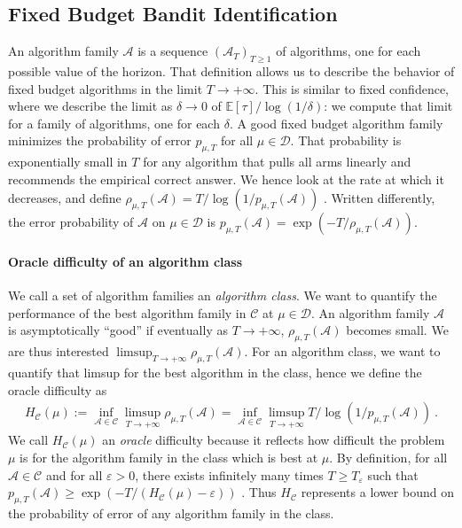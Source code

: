 \documentclass{article}
\begin{document}
\subsection{Fixed Budget Bandit Identification}
\label{sub:fixed_budget_bandit_identification}

An algorithm family $\mathcal A$ is a sequence $(\mathcal A_T)_{T \ge 1}$ of algorithms, one for each possible value of the horizon.
That definition allows us to describe the behavior of fixed budget algorithms in the limit $T \to +\infty$.
This is similar to fixed confidence, where we describe the limit as $\delta\to 0$ of $\mathbb{E}[\tau]/\log(1/\delta)$: we compute that limit for a family of algorithms, one for each $\delta$.
A good fixed budget algorithm family minimizes the probability of error $p_{\mu, T}$ for all $\mu \in \mathcal D$.
That probability is exponentially small in $T$ for any algorithm that pulls all arms linearly and recommends the empirical correct answer. We hence look at the rate at which it decreases, and define
$\rho_{\mu, T}(\mathcal A) = T / \log(1/p_{\mu, T}(\mathcal A))$ .
Written differently, the error probability of $\mathcal A$ on $\mu \in \mathcal D$ is $p_{\mu, T}(\mathcal A) = \exp(-T/\rho_{\mu, T}(\mathcal A))$.

\paragraph{Oracle difficulty of an algorithm class}
\label{par:oracle_difficulty_of_an_algorithm_class}

We call a set of algorithm families an \emph{algorithm class}.
We want to quantify the performance of the best algorithm family in $\mathcal C$ at $\mu \in \mathcal D$.
An algorithm family $\mathcal A$ is asymptotically ``good'' if eventually as $T \to + \infty$, $\rho_{\mu, T}(\mathcal A)$ becomes small.
We are thus interested $\limsup_{T \to +\infty} \rho_{\mu, T}(\mathcal A)$.
For an algorithm class, we want to quantify that limsup for the best algorithm in the class, hence we define the oracle difficulty as 
\begin{align*}
H_{\mathcal C}(\mu)
:= \inf_{\mathcal A \in \mathcal C} \limsup_{T \to +\infty} \rho_{\mu, T}(\mathcal A)
= \inf_{\mathcal A \in \mathcal C} \limsup_{T \to +\infty} T / \log(1/p_{\mu, T}(\mathcal A))
\: .
\end{align*}
We call $H_{\mathcal C}(\mu)$ an \emph{oracle} difficulty because it reflects how difficult the problem $\mu$ is for the algorithm family in the class which is best at $\mu$.
By definition, for all $\mathcal A \in \mathcal C$ and for all $\varepsilon > 0$, there exists infinitely many times $T \ge T_\varepsilon$ such that $p_{\mu, T}(\mathcal A) \ge \exp\left( - T/ (H_{\mathcal C}(\mu) - \varepsilon) \right)$ .
Thus $H_{\mathcal C}$ represents a lower bound on the probability of error of any algorithm family in the class.
\end{document}
